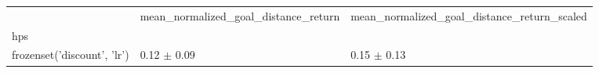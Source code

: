 \begin{tabular}{lll}
\toprule
 & mean_normalized_goal_distance_return & mean_normalized_goal_distance_return_scaled \\
hps &  &  \\
\midrule
frozenset({'discount', 'lr'}) & 0.12 $\pm$ 0.09 & 0.15 $\pm$ 0.13 \\
\bottomrule
\end{tabular}
